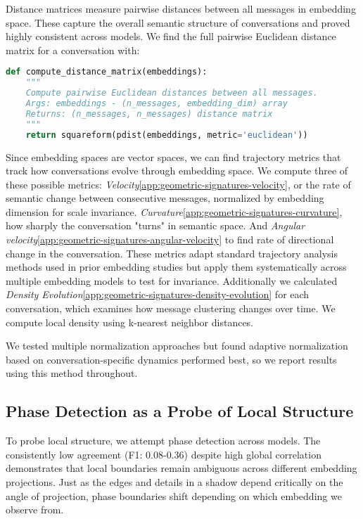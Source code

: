 \documentclass[11pt,letterpaper]{article}
\begin{document}
Distance matrices measure pairwise distances between all messages in embedding space. These capture the overall semantic structure of conversations and proved highly consistent across models. We find the full pairwise Euclidean distance matrix for a conversation with:

\begin{lstlisting}[language=Python, basicstyle=\small]
def compute_distance_matrix(embeddings):
    """
    Compute pairwise Euclidean distances between all messages.
    Args: embeddings - (n_messages, embedding_dim) array
    Returns: (n_messages, n_messages) distance matrix
    """
    return squareform(pdist(embeddings, metric='euclidean'))
\end{lstlisting}

Since embedding spaces are vector spaces, we can find trajectory metrics that track how conversations evolve through embedding space. We compute three of these possible metrics: \textit{Velocity}\ref{app:geometric-signatures-velocity}, or the rate of semantic change between consecutive messages, normalized by embedding dimension for scale invariance. \textit{Curvature}\ref{app:geometric-signatures-curvature}, how sharply the conversation "turns" in semantic space. And \textit{Angular velocity}\ref{app:geometric-signatures-angular-velocity} to find rate of directional change in the conversation. These metrics adapt standard trajectory analysis methods used in prior embedding studies \citep{brinberg2024dynamic, palominos2024trajectories} but apply them systematically across multiple embedding models to test for invariance.
Additionally we calculated \textit{Density Evolution}\ref{app:geometric-signatures-density-evolution} for each conversation, which examines how message clustering changes over time. We compute local density using k-nearest neighbor distances.

We tested multiple normalization approaches but found adaptive normalization based on conversation-specific dynamics performed best, so we report results using this method throughout.

\subsection{Phase Detection as a Probe of Local Structure}

To probe local structure, we attempt phase detection across models. The consistently low agreement (F1: 0.08-0.36) despite high global correlation demonstrates that local boundaries remain ambiguous across different embedding projections. Just as the edges and details in a shadow depend critically on the angle of projection, phase boundaries shift depending on which embedding we observe from.
\end{document}
